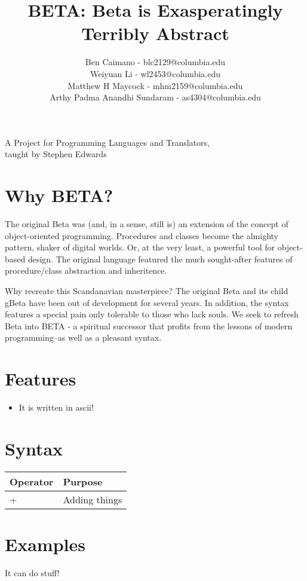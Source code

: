 \documentclass[10pt]{article}
\title{BETA: Beta is Exasperatingly Terribly Abstract}
\author{
	Ben Caimano - blc2129@columbia.edu \\
	Weiyuan Li - wl2453@columbia.edu \\
	Matthew H Maycock - mhm2159@columbia.edu \\
	Arthy Padma Anandhi Sundaram - as4304@columbia.edu
}
\date{}
\begin{document}
\maketitle
\begin{center}
\large
A Project for Programming Languages and Translators,
\\taught by Stephen Edwards
\end{center}


\section*{Why BETA?}
The original Beta was (and, in a sense, still is) an extension of the concept of object-oriented programming. Procedures and classes become the almighty pattern, shaker of digital worlds. Or, at the very least, a powerful tool for object-based design. The original language featured the much sought-after features of procedure/class abstraction and inheritence.

Why recreate this Scandanavian masterpiece? The original Beta and its child gBeta have been out of development for several years. In addition, the syntax features a special pain only tolerable to those who lack souls. We seek to refresh Beta into BETA - a spiritual successor that profits from the lessons of modern programming--as well as a pleasant syntax.

\section*{Features}
\begin{itemize}
\item It is written in ascii!
\end{itemize}

\section*{Syntax}
\begin{center}
\begin{tabular}{|p{}|p{}|}
\hline
Operator & Purpose\\ \hline
+ & Adding things\\ \hline
\end{tabular}
\end{center}

\section*{Examples}
It can do stuff!
\end{document}

